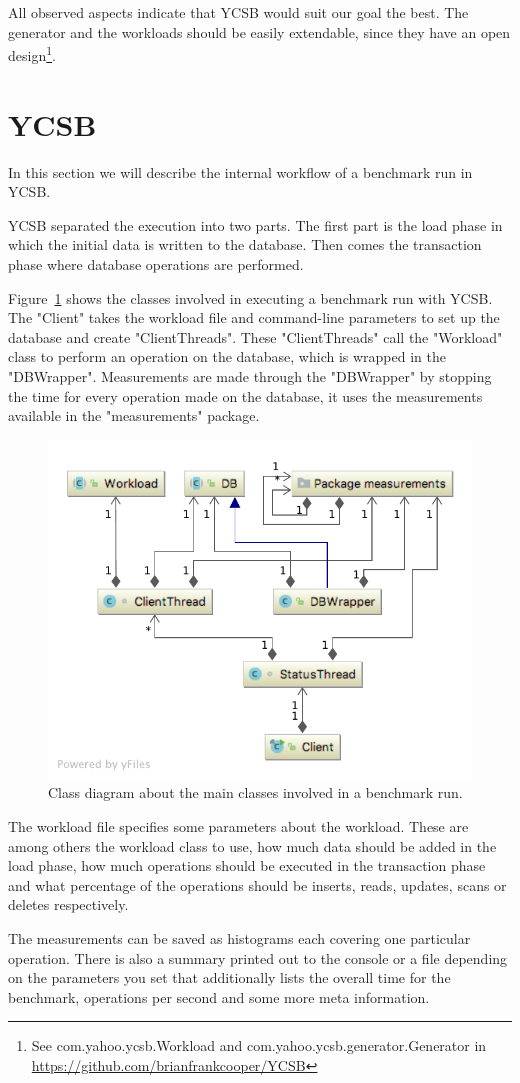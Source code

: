 All observed aspects indicate that YCSB would suit our goal the best.
The generator and the workloads should be easily extendable, since they have an open design\footnote{See com.yahoo.ycsb.Workload and com.yahoo.ycsb.generator.Generator in \url{https://github.com/brianfrankcooper/YCSB}}.

\section{YCSB}
\label{ch:analysis:se:ycsb}
In this section we will describe the internal workflow of a benchmark run in YCSB.

YCSB separated the execution into two parts.
The first part is the load phase in which the initial data is written to the database.
Then comes the transaction phase where database operations are performed.

Figure~\ref{fig:basicYCSBWorkflow} shows the classes involved in executing a benchmark run with YCSB.
The "Client" takes the workload file and command-line parameters to set up the database and create "ClientThreads".
These "ClientThreads" call the "Workload" class to perform an operation on the database,
which is wrapped in the "DBWrapper".
Measurements are made through the "DBWrapper" by stopping the time for every operation made on the database,
it uses the measurements available in the "measurements" package.

\begin{figure}
  \centering
  \includegraphics[width=.75\textwidth]{images/benchmarks/basicYCSBWorkflow}
  \caption{Class diagram about the main classes involved in a benchmark run.}
  \label{fig:basicYCSBWorkflow}
\end{figure}

The workload file specifies some parameters about the workload.
These are among others the workload class to use,
how much data should be added in the load phase,
how much operations should be executed in the transaction phase and what percentage of the operations should be inserts, reads, updates, scans or deletes respectively.

The measurements can be saved as histograms each covering one particular operation.
There is also a summary printed out to the console or a file depending on the parameters you set that additionally lists the overall time for the benchmark, operations per second and some more meta information.
